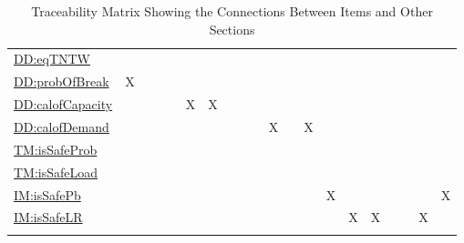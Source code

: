 \documentclass[12pt]{article}
\begin{document}
\begin{longtable}{l l l l l l l l l l l l l l l l l l l l}
\hyperref[DD:eqTNTW]{DD:eqTNTW} &  &  &  &  &  &  &  &  &  &  &  &  &  &  &  &  &  &  & 
\\
\hyperref[DD:probOfBreak]{DD:probOfBreak} & X &  &  &  &  &  &  &  &  &  &  &  &  &  &  &  &  &  & 
\\
\hyperref[DD:calofCapacity]{DD:calofCapacity} &  &  &  &  & X & X &  &  &  &  &  &  &  &  &  &  &  &  & 
\\
\hyperref[DD:calofDemand]{DD:calofDemand} &  &  &  &  &  &  &  &  &  & X &  & X &  &  &  &  &  &  & 
\\
\hyperref[TM:isSafeProb]{TM:isSafeProb} &  &  &  &  &  &  &  &  &  &  &  &  &  &  &  &  &  &  & 
\\
\hyperref[TM:isSafeLoad]{TM:isSafeLoad} &  &  &  &  &  &  &  &  &  &  &  &  &  &  &  &  &  &  & 
\\
\hyperref[IM:isSafePb]{IM:isSafePb} &  &  &  &  &  &  &  &  &  &  &  &  & X &  &  &  &  &  & X
\\
\hyperref[IM:isSafeLR]{IM:isSafeLR} &  &  &  &  &  &  &  &  &  &  &  &  &  & X & X &  &  & X & 
\\
\bottomrule
\caption{Traceability Matrix Showing the Connections Between Items and Other Sections}
\label{Table:TraceMatRefvsRef}
\end{longtable}
\end{document}
